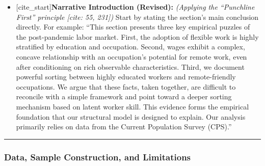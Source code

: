 \documentclass[
  11pt,
  letterpaper,
  DIV=11,
  numbers=noendperiod]{scrartcl}
\providecommand{\tightlist}{%
  \setlength{\itemsep}{0pt}\setlength{\parskip}{0pt}}\usepackage{longtable,booktabs,array}
\begin{document}
\begin{itemize}
\tightlist
\item
  {[}cite\_start{]}\textbf{Narrative Introduction (Revised):}
  \emph{(Applying the ``Punchline First'' principle {[}cite: 55,
  231{]})} Start by stating the section's main conclusion directly. For
  example: ``This section presents three key empirical puzzles of the
  post-pandemic labor market. First, the adoption of flexible work is
  highly stratified by education and occupation. Second, wages exhibit a
  complex, concave relationship with an occupation's potential for
  remote work, even after conditioning on rich observable
  characteristics. Third, we document powerful sorting between highly
  educated workers and remote-friendly occupations. We argue that these
  facts, taken together, are difficult to reconcile with a simple
  framework and point toward a deeper sorting mechanism based on latent
  worker skill. This evidence forms the empirical foundation that our
  structural model is designed to explain. Our analysis primarily relies
  on data from the Current Population Survey (CPS).''
\end{itemize}

\begin{center}\rule{0.5\linewidth}{0.5pt}\end{center}

\subsubsection{\texorpdfstring{\textbf{Data, Sample Construction, and
Limitations}}{Data, Sample Construction, and Limitations}}\label{data-sample-construction-and-limitations}
\end{document}
